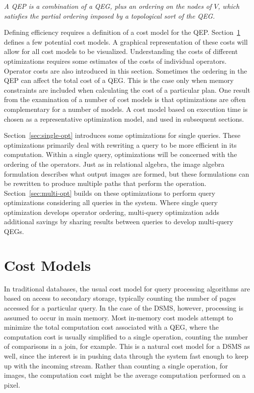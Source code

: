 \documentclass{ucdthesis}       %
\begin{document}
\emph{A \acf{QEP} is a combination of a \ac{QEG}, plus an ordering on the
  nodes of $V$, which satisfies the partial ordering imposed by a
  topological sort of the \ac{QEG}.  }

Defining efficiency requires a definition of a cost model for the
\ac{QEP}.  Section~\ref{sec:cost} defines a few potential cost
models. A graphical representation of these costs will allow for all
cost models to be visualized.  Understanding the costs of different
optimizations requires some estimates of the costs of individual
operators.  Operator costs are also introduced in this section.
Sometimes the ordering in the \ac{QEP} can affect the total cost of a
\ac{QEG}.  This is the case only when memory constraints are included
when calculating the cost of a particular plan.  One result from the
examination of a number of cost models is that optimizations are often
complementary for a number of models.  A cost model based on execution
time is chosen as a representative optimization model, and used in
subsequent sections.

Section~\ref{sec:single-opt} introduces some optimizations for single
queries.  These optimizations primarily deal with rewriting a query to
be more efficient in its computation.  Within a single query,
optimizations will be concerned with the ordering of the operators.
Just as in relational algebra, the image algebra formulation describes
what output images are formed, but these formulations can be rewritten
to produce multiple paths that perform the operation.
Section~\ref{sec:multi-opt} builds on these optimizations to perform
query optimizations considering all queries in the system.  Where
single query optimization develops operator ordering, multi-query
optimization adds additional savings by sharing results between
queries to develop multi-query \ac{QEG}s.

\section{Cost Models}
\label{sec:cost}

In traditional databases, the usual cost model for query processing
algorithms are based on access to secondary storage, typically
counting the number of pages accessed for a particular query.  In the
case of the \ac{DSMS}, however, processing is assumed to occur in
main memory.  Most in-memory cost models attempt to minimize the total
computation cost associated with a \ac{QEG}, where the computation
cost is usually simplified to a single operation, counting the number
of comparisons in a join, for example.  This is a natural cost model
for a \ac{DSMS} as well, since the interest is in pushing data through
the system fast enough to keep up with the incoming stream.  Rather
than counting a single operation, for images, the computation cost
might be the average computation performed on a pixel.
\end{document}
